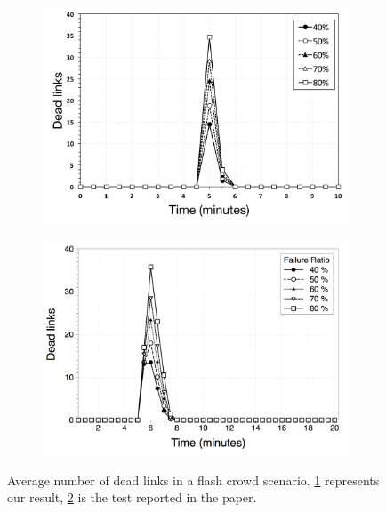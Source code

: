 \begin{figure}
\centering
\begin{subfigure}{.5\textwidth}
  \centering
  \includegraphics[keepaspectratio=true, width=1\linewidth]{images/average_dead_links}
  \caption{}
  \label{fig:average_dead_links}
\end{subfigure}%
\begin{subfigure}{.5\textwidth}
  \centering
  \includegraphics[keepaspectratio=true, width=1\linewidth]{images/paper_average_dead_links}
  \caption{}
  \label{fig:paper_average_dead_links}
\end{subfigure}
\caption{Average number of dead links in a flash crowd scenario. \ref{fig:average_dead_links} represents our result, \ref{fig:paper_average_dead_links} is the test reported in the paper.}
\label{fig:robustness_dead_links_failures}
\end{figure}

